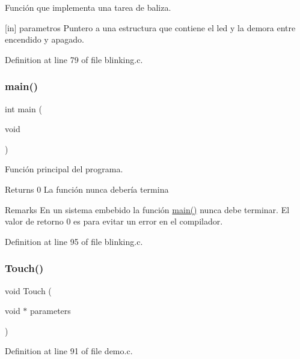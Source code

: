 Función que implementa una tarea de baliza. 

\mbox{[}in\mbox{]} parametros Puntero a una estructura que contiene el led y la demora entre encendido y apagado. 

Definition at line 79 of file blinking.\+c.

\mbox{\label{group__ejemplos_ga840291bc02cba5474a4cb46a9b9566fe}} 
\subsubsection{\texorpdfstring{main()}{main()}}
{\footnotesize\ttfamily int main (\begin{DoxyParamCaption}\item[{void}]{ }\end{DoxyParamCaption})}



Función principal del programa. 

\begin{DoxyReturn}{Returns}
0 La función nunca debería termina
\end{DoxyReturn}
\begin{DoxyRemark}{Remarks}
En un sistema embebido la función \hyperlink{group__ejemplos_ga840291bc02cba5474a4cb46a9b9566fe}{main()} nunca debe terminar. El valor de retorno 0 es para evitar un error en el compilador. 
\end{DoxyRemark}


Definition at line 95 of file blinking.\+c.

\mbox{\label{group__ejemplos_gacd6f00df9a33b3a50c5c492c0874cb97}} 
\subsubsection{\texorpdfstring{Touch()}{Touch()}}
{\footnotesize\ttfamily void Touch (\begin{DoxyParamCaption}\item[{void $\ast$}]{parameters }\end{DoxyParamCaption})}



Definition at line 91 of file demo.\+c.

